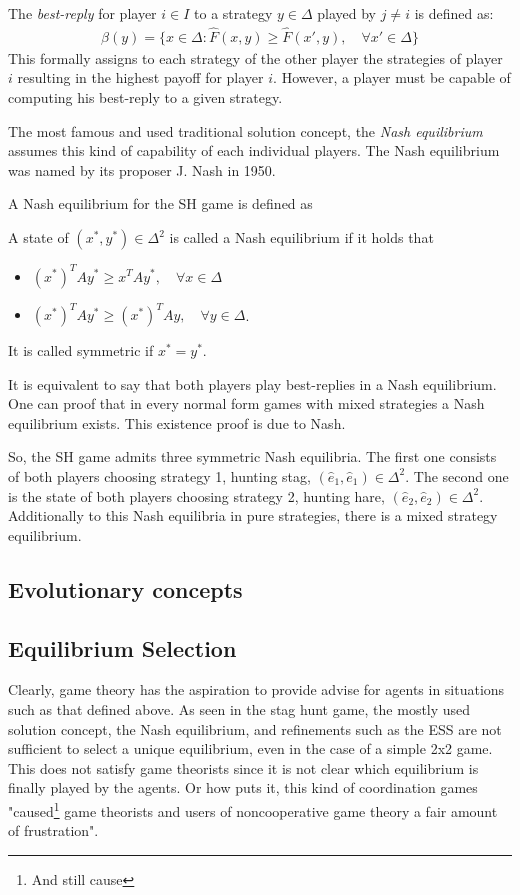 \documentclass[12pt]{article}
\begin{document}
The \textit{best-reply} for player $i \in I$ to a strategy $y \in \Delta$ 
played by $j \neq i$ is defined as:
\begin{align}
        \beta(y) = \{x \in \Delta: \hat{F}(x,y) \geq \hat{F}(x',y), 
        \quad \forall x' \in \Delta\}
\end{align}
This formally assigns to each strategy of the other player the strategies
of player $i$ resulting in the highest payoff for player $i$. However, a player
must be capable of computing his best-reply to a given strategy.

The most famous and used traditional solution concept, the \textit{Nash 
equilibrium} assumes this kind of capability of each individual players. 
The Nash equilibrium was named by its proposer J. Nash in 1950. 

A Nash equilibrium for the SH game is defined as
\begin{mydef}
        A state of $(x^*,y^*) \in \Delta^2$ is called a Nash equilibrium if 
        it holds that
\begin{itemize}
        \item   $(x^*)^T A y^* \geq x^T A y^*, \quad \forall x \in \Delta$
        \item   $(x^*)^T A y^* \geq (x^*)^T A y, \quad \forall y \in \Delta$.
\end{itemize}
        It is called symmetric if $x^* = y^*$.
\end{mydef}
It is equivalent to say that both players play best-replies in a Nash 
equilibrium. One can proof that in every normal form games with mixed 
strategies a Nash equilibrium exists. This existence proof is due to Nash.

So, the SH game admits three symmetric Nash equilibria. The first one consists
of both players choosing strategy 1, hunting stag, $(\hat{e}_1,\hat{e}_1) \in
\Delta^2$. The second one is the state of 
both players choosing strategy 2, hunting hare, $(\hat{e}_2,\hat{e}_2)
\in \Delta^2$. Additionally to this Nash equilibria in pure strategies, there 
is a mixed strategy equilibrium. 

\subsection{Evolutionary concepts}

\subsection{Equilibrium Selection}
Clearly, game theory has the aspiration to provide advise for agents in 
situations such as that defined above.
As seen in the stag hunt game, the mostly used solution concept, 
the Nash equilibrium, and refinements such as the ESS are
not sufficient to select a unique equilibrium, even in the case of a simple
2x2 game. This does not satisfy game theorists since it is not clear which
equilibrium is finally played by the agents. Or how \cite{weibull} puts it,
this kind of coordination games "caused\footnote{And still cause} game theorists and users of 
noncooperative game theory a fair amount of frustration". 
\end{document}
